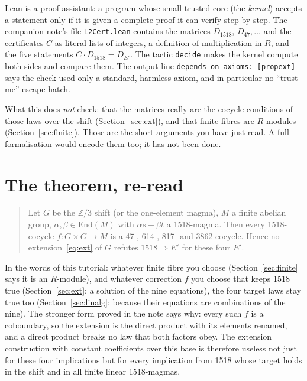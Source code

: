 \documentclass[11pt]{article}
\theoremstyle{definition}\newtheorem{example}{Example}\newtheorem{exercise}{Exercise}
\theoremstyle{remark}\newtheorem*{remark}{Remark}
\newcommand{\Z}{\mathbb{Z}}
\newcommand{\End}{\mathrm{End}}
\begin{document}
Lean is a proof assistant: a program whose small trusted core (the \emph{kernel}) accepts a statement only if it is given a complete proof it can verify step by step. The companion note's file \texttt{L2Cert.lean} contains the matrices $D_{1518}$, $D_{47},\dots$ and the certificates $C$ as literal lists of integers, a definition of multiplication in $R$, and the five statements $C\cdot D_{1518}=D_{E'}$. The tactic \texttt{decide} makes the kernel compute both sides and compare them. The output line \texttt{depends on axioms: [propext]} says the check used only a standard, harmless axiom, and in particular no ``trust me'' escape hatch.

What this does \emph{not} check: that the matrices really are the cocycle conditions of those laws over the shift (Section~\ref{sec:ext}), and that finite fibres are $R$-modules (Section~\ref{sec:finite}). Those are the short arguments you have just read. A full formalisation would encode them too; it has not been done.

\section{The theorem, re-read}\label{sec:theorem}

\begin{quote}
Let $G$ be the $\Z/3$ shift (or the one-element magma), $M$ a finite abelian group, $\alpha,\beta\in\End(M)$ with $\alpha s+\beta t$ a 1518-magma. Then every 1518-cocycle $f\colon G\times G\to M$ is a 47-, 614-, 817- and 3862-cocycle. Hence no extension~\eqref{eq:ext} of $G$ refutes $1518\Rightarrow E'$ for these four $E'$.
\end{quote}

In the words of this tutorial: whatever finite fibre you choose (Section~\ref{sec:finite} says it is an $R$-module), and whatever correction $f$ you choose that keeps 1518 true (Section~\ref{sec:ext}: a solution of the nine equations), the four target laws stay true too (Section~\ref{sec:linalg}: because their equations are combinations of the nine). The stronger form proved in the note says why: every such $f$ is a coboundary, so the extension is the direct product with its elements renamed, and a direct product breaks no law that both factors obey. The extension construction with constant coefficients over this base is therefore useless not just for these four implications but for every implication from 1518 whose target holds in the shift and in all finite linear 1518-magmas.
\end{document}
